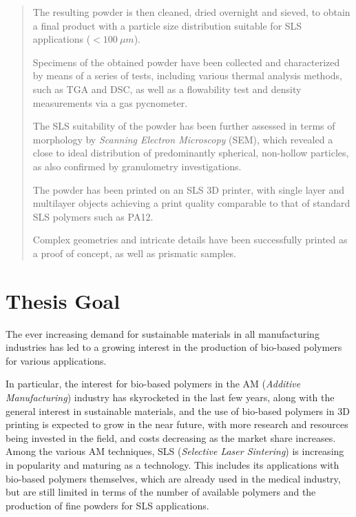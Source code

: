 \documentclass{article}
\begin{document}
\begin{abstract}
        The resulting powder is then cleaned, dried overnight and sieved, to obtain a final product with a particle size distribution suitable for SLS applications ($ < 100 \ \mu m $).


        Specimens of the obtained powder have been collected and characterized by means of a series of tests, including various thermal analysis methods, such as TGA and DSC, as well as a flowability test and density measurements via a gas pycnometer.

        The SLS suitability of the powder has been further assessed in terms of morphology by \textit{Scanning Electron Microscopy} (SEM), which revealed a close to ideal distribution of predominantly spherical, non-hollow particles, 
        as also confirmed by granulometry investigations. 

        The powder has been printed on an SLS 3D printer, with single layer and multilayer objects achieving a print quality comparable to that of standard SLS polymers such as PA12.

        Complex geometries and intricate details have been successfully printed as a proof of concept, as well as prismatic samples. 
                     


    \end{abstract}
    \newpage
    \tableofcontents
    \newpage 
    \listoffigures
    \listoftables

    \newpage

    \section{Thesis Goal\label{Thesis_Goal}}

    The ever increasing demand for sustainable materials in all manufacturing industries has led to a growing interest in the 
    production of bio-based polymers for various applications. 

    In particular, the interest for bio-based polymers in the AM (\textit{Additive Manufacturing}) industry has skyrocketed in the last few years, 
    along with the general interest in sustainable materials, and the use of bio-based polymers in 3D printing is expected to grow in the near future, 
    with more research and resources being invested in the field, and costs decreasing as the market share increases. \\  

    Among the various AM techniques, SLS (\textit{Selective Laser Sintering}) is increasing in popularity and 
    maturing as a technology. This includes its applications with bio-based polymers themselves, which are already used in the medical industry, 
    but are still limited in terms of the number of available polymers and the production of fine powders for SLS applications. \\ 
\end{document}
